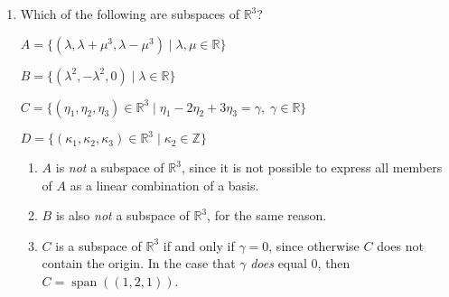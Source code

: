 \documentclass[11pt]{article}
\newcommand{\R}{\mathbb{R}}
\newcommand{\Z}{\mathbb{Z}}
\DeclareMathOperator{\Span}{span}
\theoremstyle{definition}
\theoremstyle{plain}
\theoremstyle{remark}
\begin{document}
\begin{enumerate}
\[\begin{aligned}
                   &
                  \\
                  \rightsquigarrow
                  \begin{bmatrix}
                      \begin{array}{@{\negmedspace}i{3}i{3}i{3}i{3}@{\quad}|@{\quad}i{3}i{3}i{3}i{3}@{\;\;\;}}
                          1 & 0 & 0 & 0 & 0  & -1 & 0 & 1  \\
                          0 & 1 & 0 & 0 & -1 & 0  & 0 & 1  \\
                          0 & 0 & 1 & 0 & 1  & 1  & 0 & -1 \\
                          0 & 0 & 0 & 1 & 1  & 1  & 1 & -2
                      \end{array}
                  \end{bmatrix}
                   & = \begin{bmatrix}
                           \;\mathbf{I} \;|\; \mathbf{A}^{-1} \,
                       \end{bmatrix}
              \end{aligned}
          \]

          \pagebreak

    \item[2.9] Which of the following are subspaces of \(\R^3\)?

          \(A = \{ (\lambda, \lambda + \mu^3, \lambda - \mu^3 ) \mid \lambda, \mu \in \R \}\)

          \(B = \{ (\lambda^2, -\lambda^2, 0) \mid \lambda \in \R \}\)

          \(C = \{ (\eta_1, \eta_2, \eta_3) \in \R^3 \mid \eta_1 - 2 \eta_2 + 3 \eta_3 = \gamma, \; \gamma \in \R \}\)

          \(D = \{ (\kappa_1, \kappa_2, \kappa_3) \in \R^3 \mid \kappa_2 \in \Z \}\)

          \begin{enumerate}
              \item[a.] \(A\) is \emph{not} a subspace of \(\R^3\), since it is not possible to express all members of \(A\) as a
                    linear combination of a basis.

              \item[b.] \(B\) is also \emph{not} a subspace of \(\R^3\), for the same reason.

              \item[c.] \(C\) is a subspace of \(\R^3\) if and only if \(\gamma = 0\), since otherwise \(C\) does not contain the
                    origin.  In the case that \(\gamma\) \emph{does} equal \(0\), then \(C = \Span((1, 2, 1))\).


\end{enumerate}
\end{enumerate}
\end{document}

